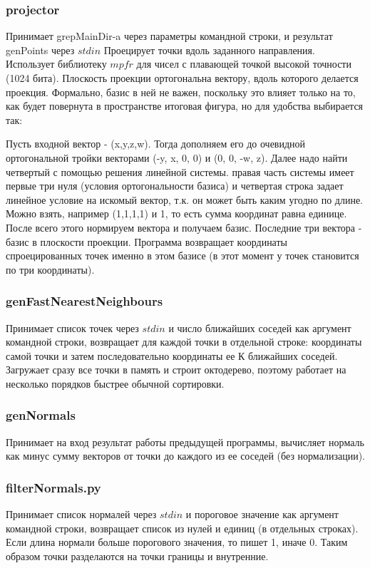 \documentclass{article}
\begin{document}
\subsubsection{projector}
Принимает grepMainDir-a через параметры командной строки, и результат genPoints через $stdin$
Проецирует точки вдоль заданного направления. Использует библиотеку $mpfr$ для чисел с плавающей точкой высокой точности (1024 бита). Плоскость проекции ортогональна вектору, вдоль которого делается проекция. Формально, базис в ней не важен, поскольку это влияет только на то, как будет повернута в пространстве итоговая фигура, но для удобства выбирается так:

Пусть входной вектор - (x,y,z,w). Тогда дополняем его до очевидной ортогональной тройки векторами (-y, x, 0, 0) и (0, 0, -w, z). Далее надо найти четвертый с помощью решения линейной системы. правая часть системы имеет первые три нуля (условия ортогональности базиса) и четвертая строка задает линейное условие на искомый вектор, т.к. он может быть каким угодно по длине. Можно взять, например (1,1,1,1) и 1, то есть сумма координат равна единице. После всего этого нормируем вектора и получаем базис. Последние три вектора - базис в плоскости проекции. Программа возвращает координаты спроецированных точек именно в этом базисе (в этот момент у точек становится по три координаты).

\subsubsection{genFastNearestNeighbours}
Принимает список точек через $stdin$ и число ближайших соседей как аргумент командной строки, возвращает для каждой точки в отдельной строке: координаты самой точки и затем последовательно координаты ее К ближайших соседей.
Загружает сразу все точки в память и строит октодерево, поэтому работает на несколько порядков быстрее обычной сортировки.


\subsubsection{genNormals}
Принимает на вход результат работы предыдущей программы, вычисляет нормаль как минус сумму векторов от точки до каждого из ее соседей (без нормализации).

\subsubsection{filterNormals.py}
Принимает список нормалей через $stdin$ и пороговое значение как аргумент командной строки, возвращает список из нулей и единиц (в отдельных строках). Если длина нормали больше порогового значения, то пишет 1, иначе 0. Таким образом точки разделаются на точки границы и внутренние.
\end{document}
